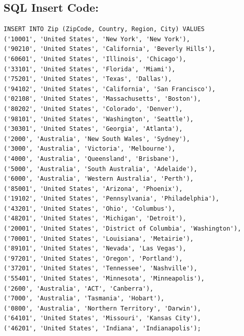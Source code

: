 \documentclass[11pt]{article}
\begin{document}
\subsection{SQL Insert Code:}
\label{sec:org7accd65}
\begin{verbatim}
INSERT INTO Zip (ZipCode, Country, Region, City) VALUES
('10001', 'United States', 'New York', 'New York'),
('90210', 'United States', 'California', 'Beverly Hills'),
('60601', 'United States', 'Illinois', 'Chicago'),
('33101', 'United States', 'Florida', 'Miami'),
('75201', 'United States', 'Texas', 'Dallas'),
('94102', 'United States', 'California', 'San Francisco'),
('02108', 'United States', 'Massachusetts', 'Boston'),
('80202', 'United States', 'Colorado', 'Denver'),
('98101', 'United States', 'Washington', 'Seattle'),
('30301', 'United States', 'Georgia', 'Atlanta'),
('2000', 'Australia', 'New South Wales', 'Sydney'),
('3000', 'Australia', 'Victoria', 'Melbourne'),
('4000', 'Australia', 'Queensland', 'Brisbane'),
('5000', 'Australia', 'South Australia', 'Adelaide'),
('6000', 'Australia', 'Western Australia', 'Perth'),
('85001', 'United States', 'Arizona', 'Phoenix'),
('19102', 'United States', 'Pennsylvania', 'Philadelphia'),
('43201', 'United States', 'Ohio', 'Columbus'),
('48201', 'United States', 'Michigan', 'Detroit'),
('20001', 'United States', 'District of Columbia', 'Washington'),
('70001', 'United States', 'Louisiana', 'Metairie'),
('89101', 'United States', 'Nevada', 'Las Vegas'),
('97201', 'United States', 'Oregon', 'Portland'),
('37201', 'United States', 'Tennessee', 'Nashville'),
('55401', 'United States', 'Minnesota', 'Minneapolis'),
('2600', 'Australia', 'ACT', 'Canberra'),
('7000', 'Australia', 'Tasmania', 'Hobart'),
('0800', 'Australia', 'Northern Territory', 'Darwin'),
('64101', 'United States', 'Missouri', 'Kansas City'),
('46201', 'United States', 'Indiana', 'Indianapolis');
\end{verbatim}
\end{document}
